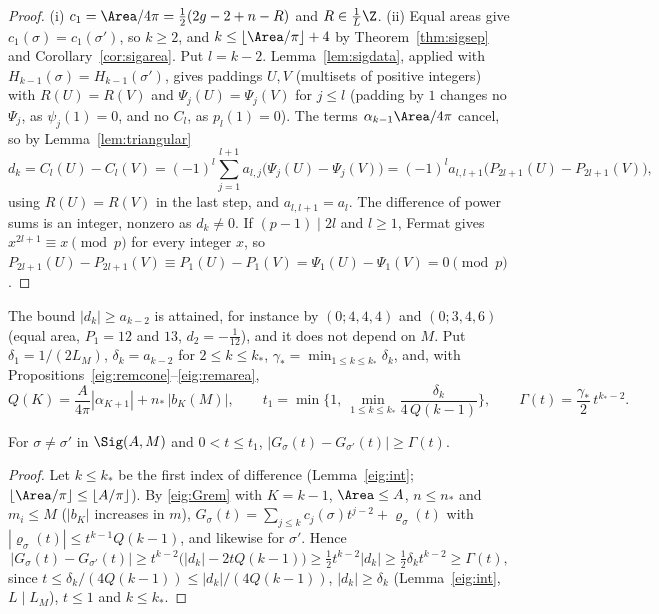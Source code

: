 \begin{proof}
(i) $c_1=\Area/4\pi=\frac12(2g-2+n-R)$ and $R\in\frac1L\Z$.
(ii) Equal areas give $c_1(\sigma)=c_1(\sigma')$, so $k\ge2$, and $k\le\lfloor\Area/\pi\rfloor+4$ by Theorem~\ref{thm:sigsep} and Corollary~\ref{cor:sigarea}. Put $l=k-2$. Lemma~\ref{lem:sigdata}, applied with $H_{k-1}(\sigma)=H_{k-1}(\sigma')$, gives paddings $U,V$ (multisets of positive integers) with $R(U)=R(V)$ and $\Psi_j(U)=\Psi_j(V)$ for $j\le l$ (padding by $1$ changes no $\Psi_j$, as $\psi_j(1)=0$, and no $C_l$, as $p_l(1)=0$). The terms $\alpha_{k-1}\Area/4\pi$ cancel, so by Lemma~\ref{lem:triangular}
\[
  d_k=C_l(U)-C_l(V)=(-1)^l\sum_{j=1}^{l+1}a_{l,j}\big(\Psi_j(U)-\Psi_j(V)\big)=(-1)^la_{l,l+1}\big(P_{2l+1}(U)-P_{2l+1}(V)\big),
\]
using $R(U)=R(V)$ in the last step, and $a_{l,l+1}=a_l$. The difference of power sums is an integer, nonzero as $d_k\ne0$. If $(p-1)\mid2l$ and $l\ge1$, Fermat gives $x^{2l+1}\equiv x\pmod p$ for every integer $x$, so $P_{2l+1}(U)-P_{2l+1}(V)\equiv P_1(U)-P_1(V)=\Psi_1(U)-\Psi_1(V)=0\pmod p$.
\end{proof}

The bound $|d_k|\ge a_{k-2}$ is attained, for instance by $(0;4,4,4)$ and $(0;3,4,6)$ (equal area, $P_1=12$ and $13$, $d_2=-\frac1{12}$), and it does not depend on $M$. Put $\delta_1=1/(2L_M)$, $\delta_k=a_{k-2}$ for $2\le k\le k_*$, $\gamma_*=\min_{1\le k\le k_*}\delta_k$, and, with Propositions~\ref{eig:remcone}--\ref{eig:remarea},
\[
  Q(K)=\frac A{4\pi}|\alpha_{K+1}|+n_*\,|b_K(M)|,\qquad t_1=\min\Big\{1,\ \min_{1\le k\le k_*}\frac{\delta_k}{4\,Q(k-1)}\Big\},\qquad \Gamma(t)=\frac{\gamma_*}2\,t^{k_*-2}.
\]

\begin{lemma}\label{eig:gap}
For $\sigma\ne\sigma'$ in $\Sig(A,M)$ and $0<t\le t_1$, $|G_\sigma(t)-G_{\sigma'}(t)|\ge\Gamma(t)$.
\end{lemma}

\begin{proof}
Let $k\le k_*$ be the first index of difference (Lemma~\ref{eig:int}; $\lfloor\Area/\pi\rfloor\le\lfloor A/\pi\rfloor$). By \eqref{eig:Grem} with $K=k-1$, $\Area\le A$, $n\le n_*$ and $m_i\le M$ ($|b_K|$ increases in $m$), $G_\sigma(t)=\sum_{j\le k}c_j(\sigma)t^{j-2}+\varrho_\sigma(t)$ with $|\varrho_\sigma(t)|\le t^{k-1}Q(k-1)$, and likewise for $\sigma'$. Hence
\[
  |G_\sigma(t)-G_{\sigma'}(t)|\ge t^{k-2}\big(|d_k|-2tQ(k-1)\big)\ge\tfrac12t^{k-2}|d_k|\ge\tfrac12\delta_kt^{k-2}\ge\Gamma(t),
\]
since $t\le\delta_k/(4Q(k-1))\le|d_k|/(4Q(k-1))$, $|d_k|\ge\delta_k$ (Lemma~\ref{eig:int}, $L\mid L_M$), $t\le1$ and $k\le k_*$.
\end{proof}

